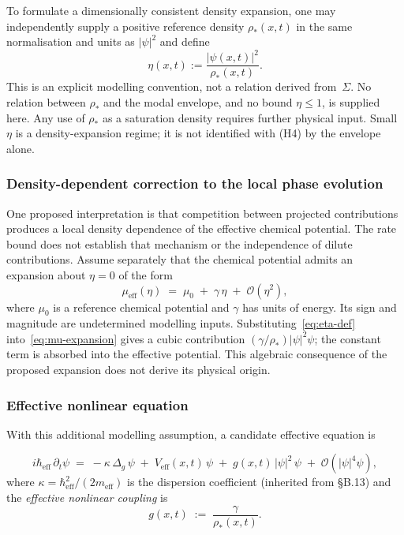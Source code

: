     To formulate a dimensionally consistent density expansion, one may independently supply a positive
    reference density $\rho_*(x,t)$ in the same normalisation and units as $|\psi|^2$ and define
    \begin{equation}
      \label{eq:eta-def}
      \eta(x,t):=\frac{|\psi(x,t)|^2}{\rho_*(x,t)}.
    \end{equation}
    This is an explicit modelling convention, not a relation derived from~$\Sigma$.
    No relation between $\rho_*$ and the modal envelope, and no bound $\eta\leq1$, is supplied here.
    Any use of $\rho_*$ as a saturation density requires further physical input.
    Small $\eta$ is a density-expansion regime; it is not identified with (H4) by the envelope alone.

  \subsubsection*{Density-dependent correction to the local phase evolution}

    One proposed interpretation is that competition between projected contributions produces a local
    density dependence of the effective chemical potential.
    The rate bound does not establish that mechanism or the independence of dilute contributions.
    Assume separately that the chemical potential admits an expansion about $\eta=0$ of the form
    \begin{equation}
      \label{eq:mu-expansion}
      \mu_{\mathrm{eff}}(\eta) \;=\; \mu_0 \;+\; \gamma\,\eta \;+\; \mathcal{O}(\eta^2),
    \end{equation}
    where $\mu_0$ is a reference chemical potential and $\gamma$ has units of energy.
    Its sign and magnitude are undetermined modelling inputs.
    Substituting~\eqref{eq:eta-def} into~\eqref{eq:mu-expansion} gives a cubic contribution
    $(\gamma/\rho_*)|\psi|^2\psi$; the constant term is absorbed into the effective potential.
    This algebraic consequence of the proposed expansion does not derive its physical origin.

  \subsubsection*{Effective nonlinear equation}

    With this additional modelling assumption, a candidate effective equation is

    \begin{equation}
      \label{eq:NLS-cosmo}
      \boxed{
        i\hbar_{\mathrm{eff}}\,\partial_t\psi
        \;=\;
        -\kappa\,\Delta_g\,\psi
        \;+\; V_{\mathrm{eff}}(x,t)\,\psi
        \;+\; g(x,t)\,|\psi|^2\,\psi
        \;+\; \mathcal{O}(|\psi|^4\psi),
      }
    \end{equation}
    where $\kappa = \hbar_{\mathrm{eff}}^2/(2m_{\mathrm{eff}})$ is the dispersion coefficient
    (inherited from §B.13) and the \emph{effective nonlinear coupling} is
    \begin{equation}
      \label{eq:g-eff}
      g(x,t) \;:=\; \frac{\gamma}{\rho_*(x,t)}.
    \end{equation}

